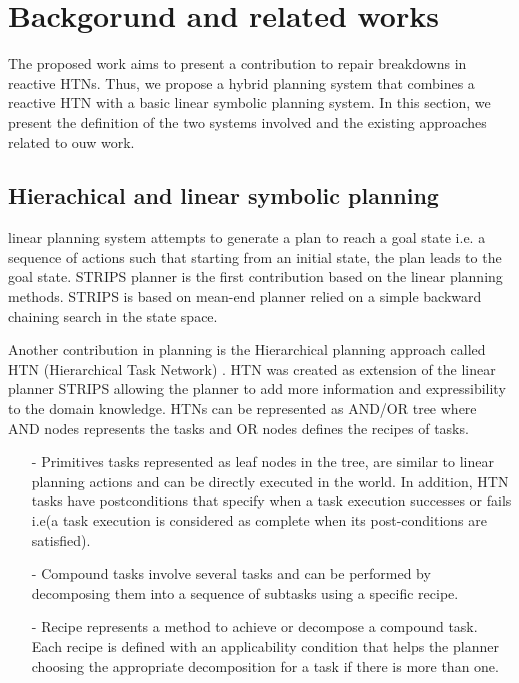\documentclass[conference]{IEEEtran}
\begin{document}
\section{Backgorund and related works}
The proposed work aims to present a contribution to repair breakdowns in reactive HTNs. Thus, we propose a hybrid planning system that combines a reactive HTN with a basic linear symbolic planning system. In this section, we present the definition of the two systems involved  and the existing approaches related to ouw work. 
\subsection{Hierachical and linear symbolic planning}
linear planning system attempts to generate a plan to reach a goal state i.e. a sequence of actions such that starting from an initial state, the plan leads to the goal state.  STRIPS planner \cite{fikes1972strips} is the first contribution based on the linear planning methods. STRIPS is based on  mean-end planner relied on a simple backward chaining search in the state space.
\par Another contribution in planning is the Hierarchical planning approach called HTN (Hierarchical Task Network)  \cite{erol1996hierarchical}. HTN was created as extension of the linear planner STRIPS  allowing the planner to add more information and expressibility to the domain knowledge. 
 HTNs can be represented as AND/OR tree where AND nodes represents the tasks and OR nodes defines the recipes of tasks. 
 \begin{itemize}
\item[-] Primitives tasks represented as leaf nodes in the tree, are similar to linear planning actions  and can be directly executed in the world. In addition, HTN tasks have postconditions that specify when a task execution successes or fails i.e(a task execution is considered as complete when its post-conditions are satisfied).
 
\item[-] Compound tasks involve several tasks and can be performed by decomposing them into a sequence of subtasks using a specific recipe. 
 
\item[-] Recipe represents  a method to achieve or decompose a compound task. Each recipe is defined with an applicability condition that helps the planner choosing the appropriate decomposition for a task if there is more than  one.
  
\end{itemize}
\end{document}
